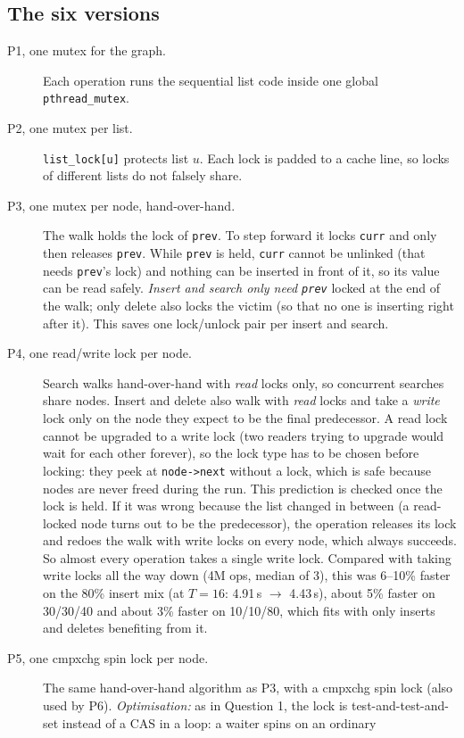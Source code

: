 \documentclass[10pt,a4paper]{article}
\begin{document}
\subsection{The six versions}
\begin{description}
\item[P1, one mutex for the graph.] Each operation runs the sequential list code inside one global \texttt{pthread\_mutex}.
\item[P2, one mutex per list.] \texttt{list\_lock[u]} protects list $u$. Each lock is padded to a cache line, so locks of different lists do not falsely share.
\item[P3, one mutex per node, hand-over-hand.] The walk holds the lock of \texttt{prev}. To step forward it locks \texttt{curr} and only then releases \texttt{prev}.
  While \texttt{prev} is held, \texttt{curr} cannot be unlinked (that needs \texttt{prev}'s lock) and nothing can be inserted in front of it, so its value can be read safely.
  \emph{Insert and search only need \texttt{prev}} locked at the end of the walk; only delete
  also locks the victim (so that no one is inserting right after it). This saves one lock/unlock pair per insert and search.
\item[P4, one read/write lock per node.] Search walks hand-over-hand with \emph{read} locks only, so concurrent searches share nodes.
  Insert and delete also walk with \emph{read} locks and take a \emph{write} lock only on the node they
  expect to be the final predecessor. A read lock cannot be upgraded to a write lock (two readers trying to upgrade would wait for each other forever),
  so the lock type has to be chosen before locking: they peek at \texttt{node->next} without a lock, which is safe because nodes are never freed during the run.
  This prediction is checked once the lock is held. If it was wrong because the list changed in between (a read-locked node turns out to be the predecessor), the
  operation releases its lock and redoes the walk with write locks on every node, which always succeeds. So almost every operation takes a single write lock.
  Compared with taking write locks all the way down (4M ops, median of 3), this was 6--10\% faster on the 80\% insert mix (at $T=16$: 4.91\,s $\to$ 4.43\,s),
  about 5\% faster on 30/30/40 and about 3\% faster on 10/10/80, which fits with only inserts and deletes benefiting from it.
\item[P5, one cmpxchg spin lock per node.] The same hand-over-hand algorithm as P3, with a cmpxchg spin lock (also used by P6).
  \emph{Optimisation:} as in Question 1, the lock is test-and-test-and-set instead of a CAS in a loop: a waiter spins on an ordinary

\end{description}
\end{document}
